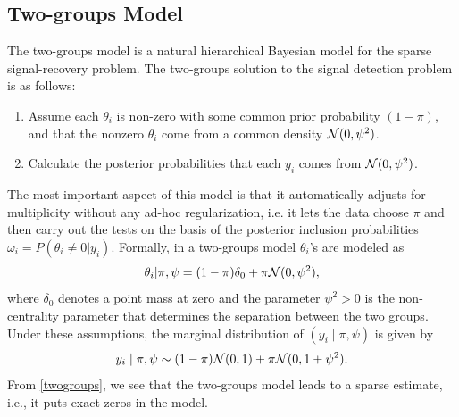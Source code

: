\documentclass[sts,preprint]{imsart}
\begin{document}
\begin{appendix}





\section{Two-groups Model}\label{sec:2gp}

The two-groups model is a natural hierarchical Bayesian model for the sparse
signal-recovery problem.  The two-groups solution to the signal detection
problem is as follows:
\begin{enumerate}
\item Assume each $\theta_i$ is non-zero with some common prior probability $(1 - \pi)$, and that the nonzero $\theta_i$ come from a common density ${\cal N}(0,\psi^2)$. 
\item Calculate the posterior probabilities that each $y_i$ comes from ${\cal N}(0,\psi^2)$. 
\end{enumerate}
The most important aspect of this model is that it automatically adjusts for multiplicity without any ad-hoc regularization, i.e. it lets the data choose $\pi$ and then carry out the tests on the basis of the posterior inclusion probabilities $\omega_i = P(\theta_i \neq 0 | y_i)$. Formally, in a two-groups model $\theta_i$'s are modeled as
\begin{equation}
\theta_i | \pi, \psi = (1-\pi)\delta_{0} + \pi {\cal N} (0, \psi^2), \label{spikeslab}
\end{equation}
where $\delta_{0}$ denotes a point mass at zero and the parameter $\psi^2>0$ is
the non-centrality parameter that determines the separation between the two
groups. Under these assumptions, the marginal distribution of $(y_i \mid \pi, \psi)$
is given by
\begin{equation}
y_i \mid \pi, \psi \sim  (1-\pi) {\cal N}(0, 1) + \pi {\cal N}(0, 1+\psi^2). \label{twogroups}
\end{equation}
From \eqref{twogroups}, we see that the two-groups model leads to a sparse
estimate, i.e., it puts exact zeros in the model. 


\end{appendix}
\end{document}
